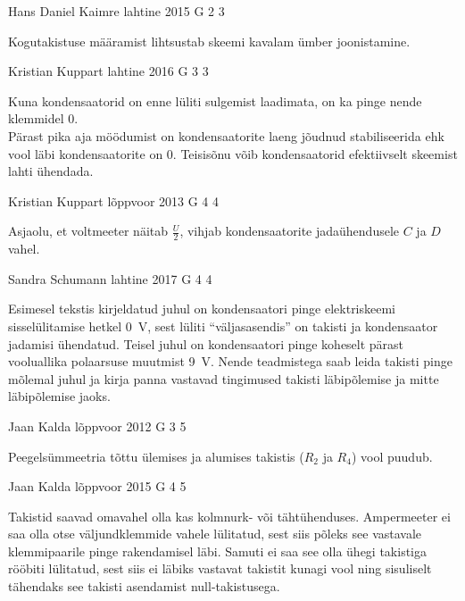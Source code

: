 \documentclass[11pt]{article}
\begin{document}
{%
{Hans Daniel Kaimre} %
{lahtine} %
{2015} %
{G 2} %
{3} %
{

\ifHint
Kogutakistuse määramist lihtsustab skeemi kavalam ümber joonistamine.
\fi
}

{Kristian Kuppart} %
{lahtine} %
{2016} %
{G 3} %
{3} %
{

\ifHint
Kuna kondensaatorid on enne lüliti sulgemist laadimata, on ka pinge nende klemmidel $0$.\\
Pärast pika aja möödumist on kondensaatorite laeng jõudnud stabiliseerida ehk vool läbi kondensaatorite on $0$. Teisisõnu võib kondensaatorid efektiivselt skeemist lahti ühendada.
\fi
}

{Kristian Kuppart} %
{lõppvoor} %
{2013} %
{G 4} %
{4} %
{

\ifHint
Asjaolu, et voltmeeter näitab $\frac{U}{2}$, vihjab kondensaatorite jadaühendusele $C$ ja $D$ vahel.
\fi
}

{Sandra Schumann} %
{lahtine} %
{2017} %
{G 4} %
{4} %
{

\ifHint
Esimesel tekstis kirjeldatud juhul on kondensaatori pinge elektriskeemi sisselülitamise hetkel \SI{0}{V}, sest lüliti \enquote{väljasasendis} on takisti ja kondensaator jadamisi ühendatud. Teisel juhul on kondensaatori pinge koheselt pärast vooluallika polaarsuse muutmist \SI{9}{V}. Nende teadmistega saab leida takisti pinge mõlemal juhul ja kirja panna vastavad tingimused takisti läbipõlemise ja mitte läbipõlemise jaoks.
\fi
}

{Jaan Kalda} %
{lõppvoor} %
{2012} %
{G 3} %
{5} %
{

\ifHint
Peegelsümmeetria tõttu ülemises ja alumises takistis ($R_2$ ja $R_4$) vool puudub. 
\fi
}

{Jaan Kalda} %
{lõppvoor} %
{2015} %
{G 4} %
{5} %
{

\ifHint
Takistid saavad omavahel olla kas kolmnurk- või tähtühenduses. Ampermeeter ei saa olla otse väljundklemmide vahele lülitatud, sest siis põleks see vastavale klemmipaarile pinge rakendamisel läbi. Samuti ei saa see olla ühegi takistiga rööbiti lülitatud, sest siis ei läbiks vastavat takistit kunagi vool ning sisuliselt tähendaks see takisti asendamist null-takistusega.
\fi
}

}
\end{document}
